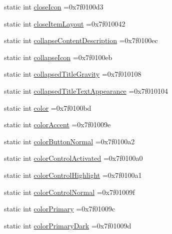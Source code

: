 \begin{DoxyCompactItemize}
static int \hyperlink{classandroid_1_1support_1_1graphics_1_1drawable_1_1R_1_1attr_a379ac22fa60c32b8bf92d28176b37183}{close\+Icon} =0x7f0100d3
\item 
static int \hyperlink{classandroid_1_1support_1_1graphics_1_1drawable_1_1R_1_1attr_ac238e30f34ad91808aab3d2ef338b4de}{close\+Item\+Layout} =0x7f010042
\item 
static int \hyperlink{classandroid_1_1support_1_1graphics_1_1drawable_1_1R_1_1attr_a59581cd712b1f007f705510de1df4256}{collapse\+Content\+Description} =0x7f0100ec
\item 
static int \hyperlink{classandroid_1_1support_1_1graphics_1_1drawable_1_1R_1_1attr_ac0d50047088c492d589b96315f628498}{collapse\+Icon} =0x7f0100eb
\item 
static int \hyperlink{classandroid_1_1support_1_1graphics_1_1drawable_1_1R_1_1attr_a350e9a353375fb4324486f5f4169224f}{collapsed\+Title\+Gravity} =0x7f010108
\item 
static int \hyperlink{classandroid_1_1support_1_1graphics_1_1drawable_1_1R_1_1attr_ae1f4e97e2d969f48c46f5508b8660493}{collapsed\+Title\+Text\+Appearance} =0x7f010104
\item 
static int \hyperlink{classandroid_1_1support_1_1graphics_1_1drawable_1_1R_1_1attr_a1791c732d6a64cc87de054a953136a6d}{color} =0x7f0100bd
\item 
static int \hyperlink{classandroid_1_1support_1_1graphics_1_1drawable_1_1R_1_1attr_a4e550a3c72e4b6094e8f70f2d5f4fc85}{color\+Accent} =0x7f01009e
\item 
static int \hyperlink{classandroid_1_1support_1_1graphics_1_1drawable_1_1R_1_1attr_a43c982b9f339efea371ad7e16b67b736}{color\+Button\+Normal} =0x7f0100a2
\item 
static int \hyperlink{classandroid_1_1support_1_1graphics_1_1drawable_1_1R_1_1attr_afcd0fe7a377ac729bf04bf31caa03b11}{color\+Control\+Activated} =0x7f0100a0
\item 
static int \hyperlink{classandroid_1_1support_1_1graphics_1_1drawable_1_1R_1_1attr_aab1666f4e064400044e0bad85557555d}{color\+Control\+Highlight} =0x7f0100a1
\item 
static int \hyperlink{classandroid_1_1support_1_1graphics_1_1drawable_1_1R_1_1attr_ae13580c7f657a3c0bcab29d6e7de54cf}{color\+Control\+Normal} =0x7f01009f
\item 
static int \hyperlink{classandroid_1_1support_1_1graphics_1_1drawable_1_1R_1_1attr_a32f9573690e6c49128663fefcac1c89a}{color\+Primary} =0x7f01009c
\item 
static int \hyperlink{classandroid_1_1support_1_1graphics_1_1drawable_1_1R_1_1attr_a0d45df04615602c93ed98a100b652b95}{color\+Primary\+Dark} =0x7f01009d

\end{DoxyCompactItemize}
